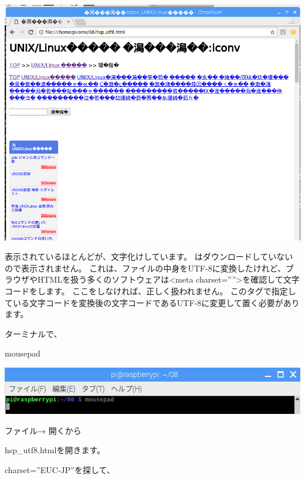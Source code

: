 \documentclass[a4paper,12pt,dvipdfmx]{jarticle}
\begin{document}
\begin{center}
\includegraphics[width=16.113cm]{textbook-img024.png}

\end{center}
表示されているほとんどが、文字化けしています。
はダウンロードしていないので表示されません。
これは、ファイルの中身をUTF-8に変換したけれど、ブラウザやHTMLを扱う多くのソフトウェアは{\textless}meta
charset=””{\textgreater}を確認して文字コードをします。
ここをしなければ、正しく扱われません。
このタグで指定している文字コードを変換後の文字コードであるUTF-8に変更して置く必要があります。


ターミナルで、

mousepad



\begin{center}
\includegraphics[width=17.006cm]{textbook-img006.png}

\end{center}
\clearpage
ファイル→ 開くから

hsp\_utf8.htmlを開きます。

charset=”EUC-JP”を探して、
\end{document}
